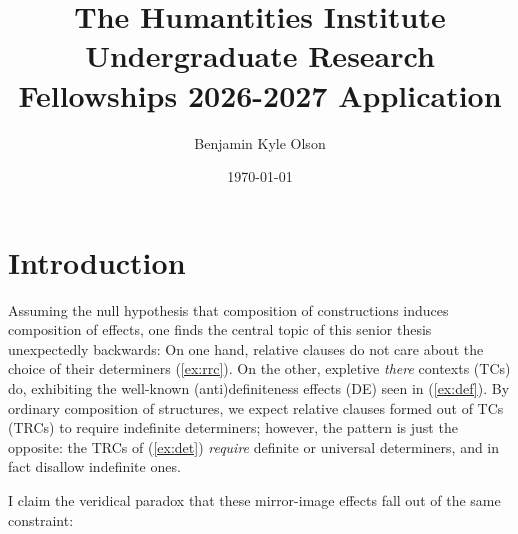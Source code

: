 \documentclass[11pt]{article}
\title{\vspace{-2cm}The Humantities Institute Undergraduate Research Fellowships 2026-2027 Application}
\author{Benjamin Kyle Olson}
\date{\today}
\begin{document}
\maketitle

\section{Introduction}
Assuming the null hypothesis that composition of constructions induces composition of effects, one finds the central topic of this senior thesis unexpectedly backwards: On one hand, relative clauses do not care about the choice of their determiners (\ref{ex:rrc}). On the other, expletive \textit{there} contexts (TCs) do, exhibiting the well-known (anti)definiteness effects (DE) seen in (\ref{ex:def}). By ordinary composition of structures, we expect relative clauses formed out of TCs (TRCs) to require indefinite determiners; however, the pattern is just the opposite: the TRCs of (\ref{ex:det}) \textit{require} definite or universal determiners, and in fact disallow indefinite ones.

\begin{exe}
    \label{ex:rrc}
    \label{ex:def}
    \label{ex:det}
\end{exe}

I claim the veridical paradox that these mirror-image effects fall out of the same constraint:

\begin{exe}
\end{exe}
\end{document}
